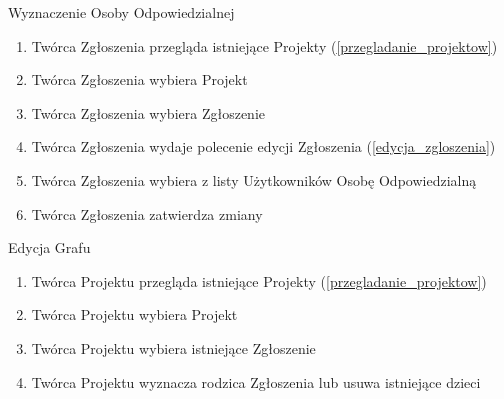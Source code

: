 \begin{usecase}{Wyznaczenie Osoby Odpowiedzialnej}
\label{wyznaczenie_osoby_odpowiedzialnej}
	\begin{enumerate}
    \item Twórca Zgłoszenia przegląda istniejące Projekty (\ref{przegladanie_projektow})
  	\item Twórca Zgłoszenia wybiera Projekt
  	\item Twórca Zgłoszenia wybiera Zgłoszenie
  	\item Twórca Zgłoszenia wydaje polecenie edycji Zgłoszenia (\ref{edycja_zgloszenia})
  	\item Twórca Zgłoszenia wybiera z listy Użytkowników Osobę Odpowiedzialną
  	\item Twórca Zgłoszenia zatwierdza zmiany
	\end{enumerate}
\end{usecase}


\begin{usecase}{Edycja Grafu}
	\begin{enumerate}
    \item Twórca Projektu przegląda istniejące Projekty (\ref{przegladanie_projektow})
    \item Twórca Projektu wybiera Projekt
    \item Twórca Projektu wybiera istniejące Zgłoszenie
    \item Twórca Projektu wyznacza rodzica Zgłoszenia lub usuwa istniejące dzieci
	\end{enumerate}
\end{usecase}



